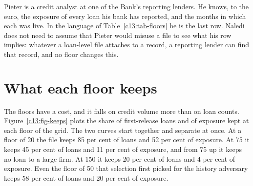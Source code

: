 Pieter is a credit analyst at one of the Bank's reporting lenders. He knows, to the
euro, the exposure of every loan his bank has reported, and the months in which each
was live. In the language of Table~\ref{c13:tab-floors} he is the last row. Naledi
does not need to assume that Pieter would misuse a file to see what his row implies:
whatever a loan-level file attaches to a record, a reporting lender can find that
record, and no floor changes this.

\section{What each floor keeps}\label{c13:sec-keeps}

The floors have a cost, and it falls on credit volume more than on loan counts.
Figure~\ref{c13:fig-keeps} plots the share of first-release loans and of exposure
kept at each floor of the grid. The two curves start together and separate at once.
At a floor of 20 the file keeps 85 per cent of loans and 52 per cent of exposure. At
75 it keeps 45 per cent of loans and 11 per cent of exposure, and from 75 up it keeps
no loan to a large firm. At 150 it keeps 20 per cent of loans and 4 per cent of
exposure. Even the floor of 50 that selection first picked for the history adversary
keeps 58 per cent of loans and 20 per cent of exposure.

